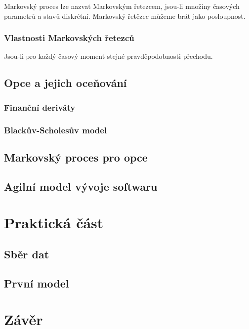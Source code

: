 \documentclass{article}
\begin{document}
  Markovský proces lze nazvat Markovským řetezcem, jsou-li množiny časových parametrů a stavů diskrétní. Markovský řetězec můžeme brát jako posloupnost.

  \subsubsection{Vlastnosti Markovských řetezců}

  Jsou-li pro každý časový moment stejné pravděpodobnosti přechodu.

  \subsection{Opce a jejich oceňování}

  \subsubsection{Finanční deriváty}

  \subsubsection{Blackův-Scholesův model}

  \subsection{Markovský proces pro opce}

  \subsection{Agilní model vývoje softwaru}

  \section{Praktická část}

  \subsection{Sběr dat}

  \subsection{První model}

  \section{Závěr}

  \printbibliography
  
\end{document}
